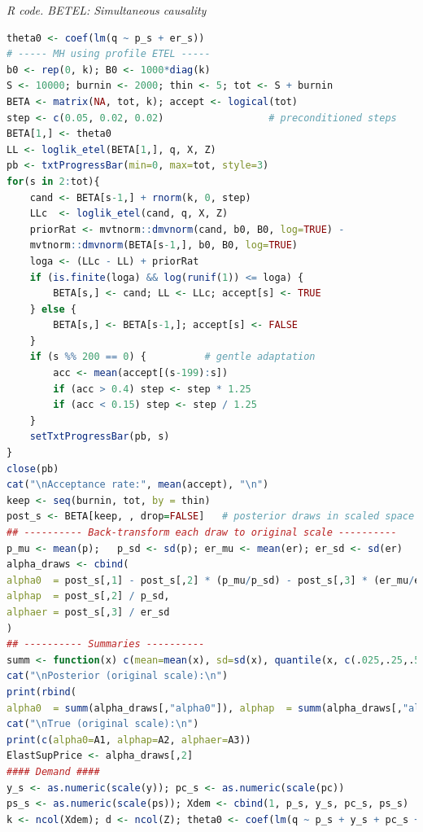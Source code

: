 \begin{enumerate}[leftmargin=*]
\begin{tcolorbox}[enhanced,width=4.67in,center upper,
	fontupper=\large\bfseries,drop shadow southwest,sharp corners]
	\textit{R code. BETEL: Simultaneous causality}
	\begin{VF}
		\begin{lstlisting}[language=R]
theta0 <- coef(lm(q ~ p_s + er_s))
# ----- MH using profile ETEL -----
b0 <- rep(0, k); B0 <- 1000*diag(k)
S <- 10000; burnin <- 2000; thin <- 5; tot <- S + burnin
BETA <- matrix(NA, tot, k); accept <- logical(tot)
step <- c(0.05, 0.02, 0.02)                  # preconditioned steps
BETA[1,] <- theta0
LL <- loglik_etel(BETA[1,], q, X, Z)
pb <- txtProgressBar(min=0, max=tot, style=3)
for(s in 2:tot){
	cand <- BETA[s-1,] + rnorm(k, 0, step)
	LLc  <- loglik_etel(cand, q, X, Z)
	priorRat <- mvtnorm::dmvnorm(cand, b0, B0, log=TRUE) -
	mvtnorm::dmvnorm(BETA[s-1,], b0, B0, log=TRUE)
	loga <- (LLc - LL) + priorRat
	if (is.finite(loga) && log(runif(1)) <= loga) {
		BETA[s,] <- cand; LL <- LLc; accept[s] <- TRUE
	} else {
		BETA[s,] <- BETA[s-1,]; accept[s] <- FALSE
	}
	if (s %% 200 == 0) {          # gentle adaptation
		acc <- mean(accept[(s-199):s])
		if (acc > 0.4) step <- step * 1.25
		if (acc < 0.15) step <- step / 1.25
	}
	setTxtProgressBar(pb, s)
}
close(pb)
cat("\nAcceptance rate:", mean(accept), "\n")
keep <- seq(burnin, tot, by = thin)
post_s <- BETA[keep, , drop=FALSE]   # posterior draws in scaled space
## ---------- Back-transform each draw to original scale ----------
p_mu <- mean(p);   p_sd <- sd(p); er_mu <- mean(er); er_sd <- sd(er)
alpha_draws <- cbind(
alpha0  = post_s[,1] - post_s[,2] * (p_mu/p_sd) - post_s[,3] * (er_mu/er_sd),
alphap  = post_s[,2] / p_sd,
alphaer = post_s[,3] / er_sd
)
## ---------- Summaries ----------
summ <- function(x) c(mean=mean(x), sd=sd(x), quantile(x, c(.025,.25,.5,.75,.975)))
cat("\nPosterior (original scale):\n")
print(rbind(
alpha0  = summ(alpha_draws[,"alpha0"]), alphap  = summ(alpha_draws[,"alphap"]), alphaer = summ(alpha_draws[,"alphaer"])))
cat("\nTrue (original scale):\n")
print(c(alpha0=A1, alphap=A2, alphaer=A3))
ElastSupPrice <- alpha_draws[,2]
#### Demand ####
y_s <- as.numeric(scale(y)); pc_s <- as.numeric(scale(pc))
ps_s <- as.numeric(scale(ps)); Xdem <- cbind(1, p_s, y_s, pc_s, ps_s) 
k <- ncol(Xdem); d <- ncol(Z); theta0 <- coef(lm(q ~ p_s + y_s + pc_s + ps_s))
\end{lstlisting}
	\end{VF}
\end{tcolorbox} 


\end{enumerate}
